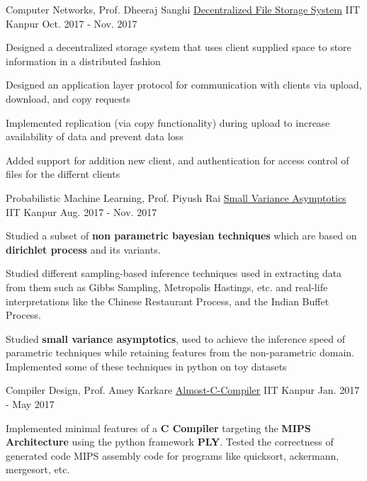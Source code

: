 \begin{cventries}
  \cventry
    {Computer Networks, Prof. Dheeraj Sanghi}
    {\href{https://bitbucket.org/arhamchopra11/decentralized_file_storage}{Decentralized File Storage System}}
    {IIT Kanpur}
    {Oct. 2017 - Nov. 2017}
    {
      \begin{cvitems}
        \item {Designed a decentralized storage system that uses client supplied space to store information in a distributed fashion}
        \item {Designed an application layer protocol for communication with clients via upload, download, and copy requests}
        \item {Implemented replication (via copy functionality) during upload to increase availability of data and prevent data loss}
        \item {Added support for addition new client, and authentication for access control of files for the differnt clients}
      \end{cvitems}
    }
  \cventry
    {Probabilistic Machine Learning, Prof. Piyush Rai}
    {\href{https://bitbucket.org/arhamchopra11/non-parametric-bayesian}{Small Variance Asymptotics}}
    {IIT Kanpur}
    {Aug. 2017 - Nov. 2017}
    {
      \begin{cvitems}
        \item {Studied a subset of \textbf{non parametric bayesian techniques} which are based on \textbf{dirichlet process} and its variants.}
        \item {Studied different sampling-based inference techniques used in extracting data from them such as Gibbs Sampling, Metropolis Hastings, etc. and real-life interpretations like the Chinese Restaurant Process, and the Indian Buffet Process.}
        \item {Studied \textbf{small variance asymptotics}, used to achieve the inference speed of parametric techniques while retaining features from the non-parametric domain. Implemented some of these techniques in python on toy datasets}
      \end{cvitems}
    }
  \cventry
    {Compiler Design, Prof. Amey Karkare}
    {\href{https://bitbucket.org/arhamchopra11/almost-c-compiler}{Almost-C-Compiler}}
    {IIT Kanpur}
    {Jan. 2017 - May 2017}
    {
      \begin{cvitems}
        \item {Implemented minimal features of a \textbf{C Compiler} targeting the \textbf{MIPS Architecture} using the python framework \textbf{PLY}. Tested the correctness of generated code MIPS assembly code for programs like quicksort, ackermann, mergesort, etc.}

\end{cvitems}}
\end{cventries}
